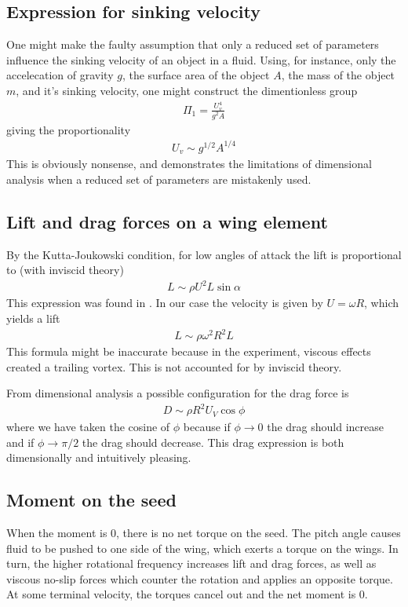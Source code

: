 \documentclass[aps,reprint]{revtex4-1}
\begin{document}
\subsection{Expression for sinking velocity}
One might make the faulty assumption that only a reduced set of parameters influence the sinking velocity of an object in a fluid. Using, for instance, only the accelecation of gravity $g$, the surface area of the object $A$, the mass of the object $m$, and it's sinking velocity, one might construct the dimentionless group
\begin{align*}
    \Pi_1 = \frac{U_v^4}{g^2A}
\end{align*}
giving the proportionality
\begin{align*}
    U_v \sim g^{1/2}A^{1/4}
\end{align*}
This is obviously nonsense, and demonstrates the limitations of dimensional analysis when a reduced set of parameters are mistakenly used.

\subsection{Lift and drag forces on a wing element}
By the Kutta-Joukowski condition, for low angles of attack the lift is
proportional to (with inviscid theory)
\begin{align*}
    L \sim \rho U^2 L \sin{\alpha}
\end{align*}
This expression was found in \cite{acheson}.
In our case the velocity is given by $U = \omega R$, which yields a lift
\begin{align}
  L \sim \rho \omega^2 R^2 L
\end{align}
This formula might be inaccurate because in the experiment, viscous effects
created a trailing vortex. This is not accounted for by inviscid theory.

From dimensional analysis a possible configuration for the drag force is
\begin{align}
  D \sim \rho R^2 U_V \cos{\phi}
\end{align}
where we have taken the cosine of $\phi$ because if $\phi \rightarrow 0$ the
drag should increase and if $\phi \rightarrow \pi/2$ the drag should decrease.
This drag expression is both dimensionally and intuitively pleasing.
\subsection{Moment on the seed}
When the moment is 0, there is no net torque on the seed. The pitch angle causes
fluid to be pushed to one side of the wing, which exerts a torque on the wings.
In turn, the higher rotational frequency increases lift and drag forces, as well
as viscous no-slip forces which counter the rotation and applies an opposite
torque. At some terminal velocity, the torques cancel out and the net moment is
0.
\end{document}
